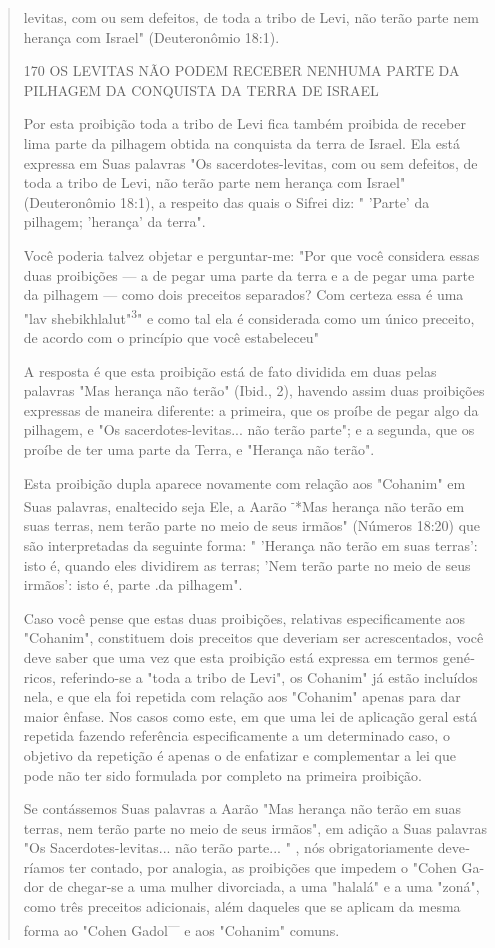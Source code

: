 \begin{quote}levitas, com ou sem defeitos, de toda a tribo de Levi, não terão parte
nem he­rança com Israel" (Deuteronômio 18:1).

170 OS LEVITAS NÃO PODEM RECEBER NENHUMA PARTE DA PILHAGEM DA CONQUISTA
DA TERRA DE ISRAEL

Por esta proibição toda a tribo de Levi fica também proibida de re­ceber
lima parte da pilhagem obtida na conquista da terra de Israel. Ela está
expressa em Suas palavras "Os sacerdotes-levitas, com ou sem defeitos,
de to­da a tribo de Levi, não terão parte nem herança com Israel"
(Deuteronômio 18:1), a respeito das quais o Sifrei diz: " 'Parte' da
pilhagem; 'herança' da terra".

Você poderia talvez objetar e perguntar-me: "Por que você conside­ra
essas duas proibições --- a de pegar uma parte da terra e a de pegar uma
parte da pilhagem --- como dois preceitos separados? Com certeza essa é
uma "lav shebikhlalut"\textsuperscript{3}" e como tal ela é considerada
como um único preceito, de acordo com o princípio que você estabeleceu"

A resposta é que esta proibição está de fato dividida em duas pelas
palavras "Mas herança não terão" (Ibid., 2), havendo assim duas
proibições ex­pressas de maneira diferente: a primeira, que os proíbe de
pegar algo da pilha­gem, e "Os sacerdotes-levitas... não terão parte"; e
a segunda, que os proíbe de ter uma parte da Terra, e "Herança não
terão".

Esta proibição dupla aparece novamente com relação aos "Cohanim" em Suas
palavras, enaltecido seja Ele, a Aarão \textsuperscript{-}*Mas herança
não terão em suas terras, nem terão parte no meio de seus irmãos"
(Números 18:20) que são in­terpretadas da seguinte forma: " 'Herança não
terão em suas terras': isto é, quan­do eles dividirem as terras; 'Nem
terão parte no meio de seus irmãos': isto é, parte .da pilhagem".

Caso você pense que estas duas proibições, relativas especificamen­te
aos "Cohanim", constituem dois preceitos que deveriam ser acrescentados,
você deve saber que uma vez que esta proibição está expressa em termos
gené­ricos, referindo-se a "toda a tribo de Levi", os Cohanim" já estão
incluídos nela, e que ela foi repetida com relação aos "Cohanim" apenas
para dar maior ênfase. Nos casos como este, em que uma lei de aplicação
geral está repetida fazendo referência especificamente a um determinado
caso, o objetivo da re­petição é apenas o de enfatizar e complementar a
lei que pode não ter sido for­mulada por completo na primeira proibição.

Se contássemos Suas palavras a Aarão "Mas herança não terão em suas
terras, nem terão parte no meio de seus irmãos", em adição a Suas
pala­vras "Os Sacerdotes-levitas... não terão parte... " , nós
obrigatoriamente deve­ríamos ter contado, por analogia, as proibições
que impedem o "Cohen Ga-dor de chegar-se a uma mulher divorciada, a uma
"halalá" e a uma "zoná", como três preceitos adicionais, além daqueles
que se aplicam da mesma forma ao "Cohen Gadol\textsuperscript{---} e aos
"Cohanim" comuns.
\end{quote}

